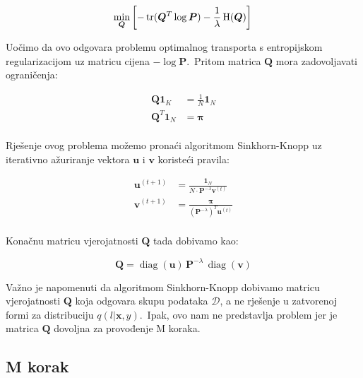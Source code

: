 \documentclass[diplomskirad]{fer}
\begin{document}
\begin{equation}
    \min_{\bm{Q}} \left[-\operatorname{tr}(\bm{Q}^T \log \bm{P}) - \frac{1}{\lambda} \operatorname{H}(\bm{Q}) \right] \\ 
  \label{eq:vibe_e_reversed}
\end{equation}

Uočimo da ovo odgovara problemu optimalnog transporta s entropijskom regularizacijom uz matricu cijena $-\log \bm{P}$.\ Pritom matrica $\bm{Q}$ mora zadovoljavati ograničenja:

\begin{equation}
  \begin{aligned}
    \bm{Q} \bm{1}_K &= \frac{1}{N} \bm{1}_N \\
    \bm{Q}^T \bm{1}_N &= \bm{\pi} \\
  \end{aligned}
\label{eq:vibe_q_matrix_restrictions}
\end{equation}

\pagebreak

Rješenje ovog problema možemo pronaći algoritmom Sinkhorn-Knopp uz iterativno ažuriranje vektora $\bm{u}$ i $\bm{v}$ koristeći pravila:

\begin{equation}
  \begin{aligned}
    \bm{u}^{(t + 1)} &= \frac{\bm{1}_N}{N \cdot \bm{P}^{-\lambda} \bm{v}^{(t)}} \\
    \bm{v}^{(t + 1)} &= \frac{\bm{\pi}}{(\bm{P}^{-\lambda})^T \bm{u}^{(t)}} \\
  \end{aligned}
  \label{eq:vibe_sk_rules}
\end{equation}

Konačnu matricu vjerojatnosti $\bm{Q}$ tada dobivamo kao:

\begin{equation}
  \bm{Q} = \operatorname{diag}(\bm{u})\,\bm{P}^{-\lambda}\,\operatorname{diag}(\bm{v})
  \label{eq:vibe_q_formula}
\end{equation}

Važno je napomenuti da algoritmom Sinkhorn-Knopp dobivamo matricu vjerojatnosti $\bm{Q}$ koja odgovara skupu podataka $\mathcal{D}$, a ne rješenje u zatvorenoj formi za distribuciju $q(l | \bm{x}, y)$.\ 
Ipak, ovo nam ne predstavlja problem jer je matrica $\bm{Q}$ dovoljna za provođenje M koraka.\

\subsection{M korak}
\label{sub:m_korak}
\end{document}
